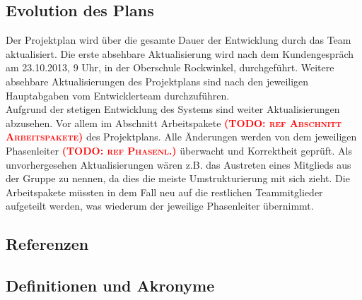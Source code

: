 \documentclass[fontsize=12pt,paper=a4,twoside]{scrartcl}
\newcommand{\todo}[1]{\textbf{\textsc{\textcolor{red}{(TODO: #1)}}}}
\begin{document}
\subsection{Evolution des Plans}

Der Projektplan wird über die gesamte Dauer der Entwicklung durch das Team aktualisiert. Die erste absehbare Aktualisierung wird nach dem Kundengespräch am 23.10.2013, 9 Uhr, in der Oberschule Rockwinkel, durchgeführt. Weitere absehbare Aktualisierungen des Projektplans sind nach den jeweiligen Hauptabgaben vom Entwicklerteam durchzuführen. \\
Aufgrund der stetigen Entwicklung des Systems sind weiter Aktualisierungen abzusehen. Vor allem im Abschnitt Arbeitspakete \todo{ref Abschnitt Arbeitspakete} des Projektplans. Alle Änderungen werden von dem jeweiligen Phasenleiter \todo{ref Phasenl.} überwacht und Korrektheit geprüft. Als unvorhergesehen Aktualisierungen wären z.B. das Austreten eines Mitglieds aus der Gruppe zu nennen, da dies die meiste Umstrukturierung mit sich zieht. Die Arbeitspakete müssten in dem Fall neu auf die restlichen Teammitglieder aufgeteilt werden, was wiederum der jeweilige Phasenleiter übernimmt.

\subsection{Referenzen}
%
%
%
%

{\renewcommand\section[2]{}

}

\newpage

\subsection{Definitionen und Akronyme\\}
\end{document}
